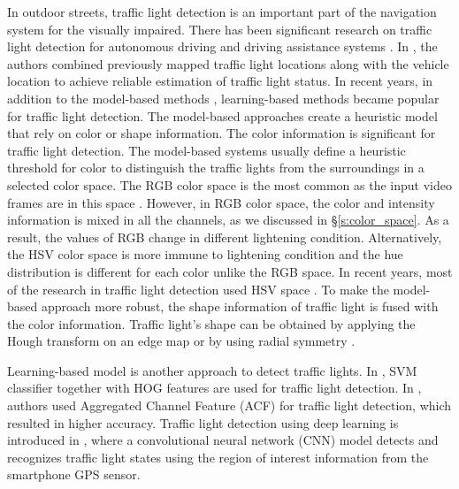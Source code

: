 In outdoor streets, traffic light detection is an important part of the navigation system for the visually impaired.
There has been significant research on traffic light detection for autonomous driving and driving assistance systems \cite{traffic_turan,selfdrive,traffic,traffic2,traffic3}.
In \cite{traffic_turan}, the authors combined previously mapped traffic light locations along with the vehicle location to achieve reliable estimation of traffic light status.
In recent years, in addition to the model-based methods \cite{model,model2}, learning-based methods \cite{survey_traffic} became popular for traffic light detection.
The model-based approaches create a heuristic model that rely on color or shape information.
The color information is significant for traffic light detection.
The model-based systems usually define a heuristic threshold for color to distinguish the traffic lights from the surroundings in a selected color space.
The RGB color space is the most common as the input video frames are in this space \cite{rgb2}.
However, in RGB color space, the color and intensity information is mixed in all the channels, as we discussed in \S\ref{s:color_space}.
As a result, the values of RGB change in different lightening condition.
Alternatively, the HSV color space is more immune to lightening condition and the hue distribution is different for each color unlike the RGB space.
In recent years, most of the research in traffic light detection used HSV space \cite{hsv2}.
To make the model-based approach  more robust, the shape information of traffic light is fused with the color information.
Traffic light's shape can be obtained by applying the Hough transform on an edge map \cite{hough,hough2,signalguru} or by using radial symmetry \cite{radial,radial2}.

Learning-based model \cite{learning,learning2} is another approach to detect traffic lights.
In \cite{selfdrive}, SVM classifier together with HOG features are used for traffic light detection. 
In \cite{acf,acf2,lisa_cvpr}, authors used Aggregated Channel Feature (ACF) for traffic light detection, which resulted in higher accuracy.
Traffic light detection using deep learning is introduced in \cite{cnn,cnn2,cnn3}, where a convolutional neural network (CNN) model detects and recognizes traffic light states using the region of interest information from the smartphone GPS sensor.

